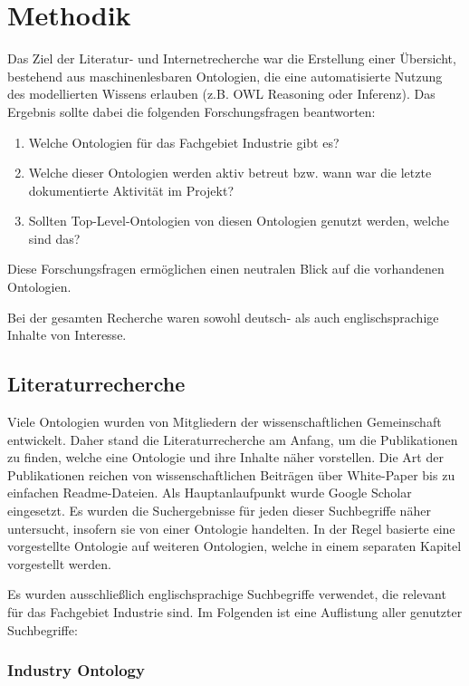 \documentclass{article}
\begin{document}
\section{Methodik}

Das Ziel der Literatur- und Internetrecherche war die Erstellung einer Übersicht, bestehend aus maschinenlesbaren Ontologien, die eine automatisierte Nutzung des modellierten Wissens erlauben (z.B. OWL Reasoning oder Inferenz).
Das Ergebnis sollte dabei die folgenden Forschungsfragen beantworten:

\begin{enumerate}
    \item Welche Ontologien für das Fachgebiet Industrie gibt es?
    \item Welche dieser Ontologien werden aktiv betreut bzw. wann war die letzte dokumentierte Aktivität im Projekt?
    \item Sollten Top-Level-Ontologien von diesen Ontologien genutzt werden, welche sind das?
\end{enumerate}

Diese Forschungsfragen ermöglichen einen neutralen Blick auf die vorhandenen Ontologien.

Bei der gesamten Recherche waren sowohl deutsch- als auch englischsprachige Inhalte von Interesse.

\subsection{Literaturrecherche}

Viele Ontologien wurden von Mitgliedern der wissenschaftlichen Gemeinschaft entwickelt.
Daher stand die Literaturrecherche am Anfang, um die Publikationen zu finden, welche eine Ontologie und ihre Inhalte näher vorstellen.
Die Art der Publikationen reichen von wissenschaftlichen Beiträgen über White-Paper bis zu einfachen Readme-Dateien.
Als Hauptanlaufpunkt wurde Google Scholar eingesetzt.
Es wurden die Suchergebnisse für jeden dieser Suchbegriffe näher untersucht, insofern sie von einer Ontologie handelten.
In der Regel basierte eine vorgestellte Ontologie auf weiteren Ontologien, welche in einem separaten Kapitel vorgestellt werden.

Es wurden ausschließlich englischsprachige Suchbegriffe verwendet, die relevant für das Fachgebiet Industrie sind.
Im Folgenden ist eine Auflistung aller genutzter Suchbegriffe:

\subsubsection{Industry Ontology}
\end{document}
